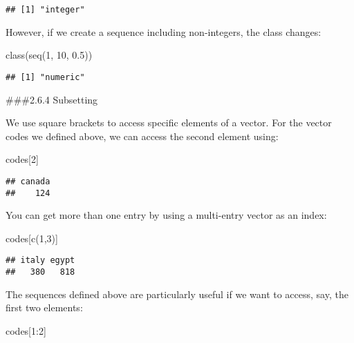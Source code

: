 \documentclass[
]{article}
\newenvironment{Shaded}{\begin{snugshade}}{\end{snugshade}}
\newcommand{\DecValTok}[1]{\textcolor[rgb]{0.00,0.00,0.81}{#1}}
\newcommand{\FloatTok}[1]{\textcolor[rgb]{0.00,0.00,0.81}{#1}}
\newcommand{\FunctionTok}[1]{\textcolor[rgb]{0.00,0.00,0.00}{#1}}
\newcommand{\NormalTok}[1]{#1}
\newcommand{\SpecialCharTok}[1]{\textcolor[rgb]{0.00,0.00,0.00}{#1}}
\begin{document}
\begin{verbatim}
## [1] "integer"
\end{verbatim}

However, if we create a sequence including non-integers, the class
changes:

\begin{Shaded}
\begin{Highlighting}[]
\FunctionTok{class}\NormalTok{(}\FunctionTok{seq}\NormalTok{(}\DecValTok{1}\NormalTok{, }\DecValTok{10}\NormalTok{, }\FloatTok{0.5}\NormalTok{))}
\end{Highlighting}
\end{Shaded}

\begin{verbatim}
## [1] "numeric"
\end{verbatim}

\#\#\#2.6.4 Subsetting

We use square brackets to access specific elements of a vector. For the
vector codes we defined above, we can access the second element using:

\begin{Shaded}
\begin{Highlighting}[]
\NormalTok{codes[}\DecValTok{2}\NormalTok{]}
\end{Highlighting}
\end{Shaded}

\begin{verbatim}
## canada 
##    124
\end{verbatim}

You can get more than one entry by using a multi-entry vector as an
index:

\begin{Shaded}
\begin{Highlighting}[]
\NormalTok{codes[}\FunctionTok{c}\NormalTok{(}\DecValTok{1}\NormalTok{,}\DecValTok{3}\NormalTok{)]}
\end{Highlighting}
\end{Shaded}

\begin{verbatim}
## italy egypt 
##   380   818
\end{verbatim}

The sequences defined above are particularly useful if we want to
access, say, the first two elements:

\begin{Shaded}
\begin{Highlighting}[]
\NormalTok{codes[}\DecValTok{1}\SpecialCharTok{:}\DecValTok{2}\NormalTok{]}
\end{Highlighting}
\end{Shaded}
\end{document}

